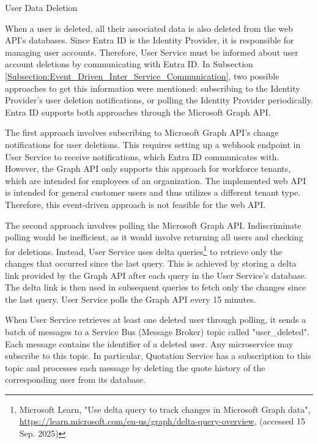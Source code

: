 \documentclass[12pt, reqno, oneside]{amsbook}
\makeatletter
\def\subsection{\@startsection{subsection}{2}%
      \z@{.5\linespacing\@plus.7\linespacing}{.25\linespacing}%
      {\normalfont\bfseries\flushleft}}
\theoremstyle{definition}
\theoremstyle{definition}
\numberwithin{section}{chapter}
\numberwithin{table}{chapter}
\numberwithin{figure}{chapter}
\makeatother
\begin{document}
\subsection{User Data Deletion}
\label{Subsection:User_Data_Deletion}

When a user is deleted, all their associated data is also deleted from the web \ac{API}'s databases. Since Entra ID is the Identity Provider, it is responsible for managing user accounts. Therefore, User Service must be informed about user account deletions by communicating with Entra ID. In Subsection \ref{Subsection:Event_Driven_Inter_Service_Communication}, two possible approaches to get this information were mentioned: subscribing to the Identity Provider's user deletion notifications, or polling the Identity Provider periodically. Entra ID supports both approaches through the Microsoft Graph \ac{API}.

The first approach involves subscribing to Microsoft Graph \ac{API}'s change notifications for user deletions. This requires setting up a webhook endpoint in User Service to receive notifications, which Entra ID communicates with. However, the Graph \ac{API} only supports this approach for workforce tenants, which are intended for employees of an organization. The implemented web \ac{API} is intended for general customer users and thus utilizes a different tenant type. Therefore, this event-driven approach is not feasible for the web \ac{API}.

The second approach involves polling the Microsoft Graph \ac{API}. Indiscriminate polling would be inefficient, as it would involve returning all users and checking for deletions. Instead, User Service uses delta queries\footnote{Microsoft Learn, "Use delta query to track changes in Microsoft Graph data", \url{https://learn.microsoft.com/en-us/graph/delta-query-overview}, (accessed 15 Sep. 2025)} to retrieve only the changes that occurred since the last query. This is achieved by storing a delta link provided by the Graph \ac{API} after each query in the User Service's database. The delta link is then used in subsequent queries to fetch only the changes since the last query. User Service polls the Graph \ac{API} every 15 minutes.

When User Service retrieves at least one deleted user through polling, it sends a batch of messages to a Service Bus (Message Broker) topic called "user\_deleted". Each message contains the identifier of a deleted user. Any microservice may subscribe to this topic. In particular, Quotation Service has a subscription to this topic and processes each message by deleting the quote history of the corresponding user from its database.
\end{document}

